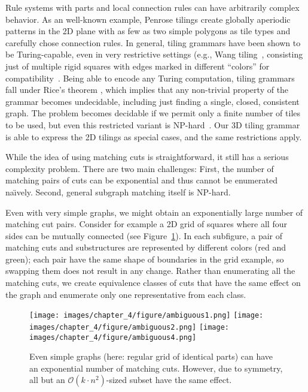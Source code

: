 Rule systems with parts and local connection rules can have arbitrarily complex behavior.
As an well-known example, Penrose tilings create globally aperiodic patterns in the 2D plane with as few as two simple polygons as tile types and carefully chose connection rules. In general, tiling grammars have been shown to be Turing-capable, even in very restrictive settings (e.g., Wang tiling~\cite{Cohen2003}, consisting just of multiple rigid squares with edges marked in different ``colors'' for compatibility~\cite{Berger1966}.
Being able to encode any Turing computation, tiling grammars fall under Rice's theorem \cite{HopcroftUllman79}, which implies that any non-trivial property of the grammar becomes undecidable, including just finding a single, closed, consistent graph. %
The problem becomes decidable if we permit only a finite number of tiles to be used, but even this restricted variant is NP-hard~\cite{Demaine2007}.
Our 3D tiling grammar is able to express the 2D tilings as special cases, and the same restrictions apply.


While the idea of using matching cuts is straightforward, it still has a serious complexity problem. There are two main challenges: First, the number of matching pairs of cuts can be exponential and thus cannot be enumerated na\"{\i}vely. Second, general subgraph matching itself is NP-hard.

Even with very simple graphs, we might obtain an exponentially large number of matching cut pairs. Consider for example a 2D grid of squares where all four sides can be mutually connected (see Figure~\ref{fig:ambiguous}). In each subfigure,
a pair of matching cuts and substructures are represented by different colors (red and green); each pair have the same shape of boundaries in the grid example, so swapping them does not result in any change. Rather than enumerating all the matching cuts, we create equivalence classes of cuts that have the same effect on the graph and enumerate only one representative from each class.

\begin{figure}[t!]
	\centering
	\texttt{[image: images/chapter\_4/figure/ambiguous1.png]}
	\hspace{2mm}
	\texttt{[image: images/chapter\_4/figure/ambiguous2.png]}
	\hspace{2mm}
	\texttt{[image: images/chapter\_4/figure/ambiguous4.png]}	
	\caption[The matching cuts on a simple 2D grid.]{Even simple graphs (here: regular grid of identical parts) can have an exponential number of matching cuts. However, due to symmetry, all but an $\mathcal{O}(k \cdot n^2)$-sized subset have the same effect.}
	\label{fig:ambiguous}
\end{figure}

